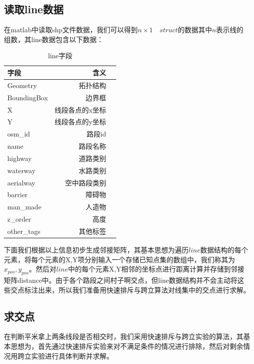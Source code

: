\subsection{读取line数据}
在matlab中读取shp文件数据，我们可以得到$n \times 1 \quad struct$的数据其中$n$表示线的组数，其line数据包含以下数据：
\begin{table}[htbp]
    \centering
    \caption{line字段}
      \begin{tabular}{|l|r|l|}
      \hline
      字段    & 含义 \\
      \hline
      Geometry & 拓扑结构 \\
      BoundingBox & 边界框 \\
      X     & 线段各点的x坐标 \\
      Y     & 线段各点的y坐标 \\
      osm\_id & 路段id \\
      name  & 路段名称 \\
      highway & 道路类别 \\
      waterway & 水路类别 \\
      aerialway & 空中路段类别 \\
      barrier & 障碍物 \\
      man\_made & 人造物 \\
      z\_order & 高度 \\
      other\_tags & 其他标签 \\
      \hline
      \end{tabular}%
    \label{tab:lzd}%
\end{table}%
下面我们根据以上信息初步生成邻接矩阵，其基本思想为遍历$line$数据结构的每个元素，将每个元素的X,Y项分别输入一个存储已知点集的数组中，我们称其为$x_{pos},y_{pos}$。然后对$line$中的每个元素X,Y相邻的坐标点进行距离计算并存储到邻接矩阵distance中。由于各个路段之间村子啊交点，但line数据结构并不会主动将这些交点标注出来，所以我们准备用快速排斥与跨立算法对线集中的交点进行求解。
\subsection{求交点}
在判断平米拿上两条线段是否相交时，我们采用快速排斥与跨立实验的算法，其基本思想为，首先通过快速排斥实验来对不满足条件的情况进行排除，然后对剩余情况用跨立实验进行具体判断并求解。
